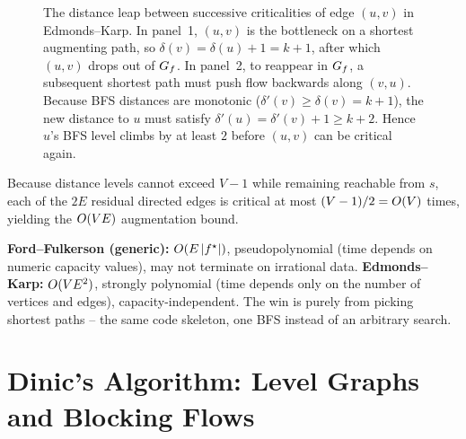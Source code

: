 \begin{figure}[H]
\caption{The distance leap between successive criticalities of edge $(u,v)$ in Edmonds--Karp. In panel~1, $(u,v)$ is the bottleneck on a shortest augmenting path, so $\delta(v)=\delta(u)+1=k+1$, after which $(u,v)$ drops out of $G_f$. In panel~2, to reappear in $G_f$, a subsequent shortest path must push flow backwards along $(v,u)$. Because BFS distances are monotonic ($\delta'(v)\ge\delta(v)=k+1$), the new distance to $u$ must satisfy $\delta'(u)=\delta'(v)+1\ge k+2$. Hence $u$'s BFS level climbs by at least $2$ before $(u,v)$ can be critical again.}
\label{ch12:fig-ek-critical}
\end{figure}

Because distance levels cannot exceed $V-1$ while remaining reachable from $s$, each of the $2E$ residual directed edges is critical at most $(V-1)/2 = O(V)$ times, yielding the $O(VE)$ augmentation bound.

\begin{complexitybox}
\textbf{Ford--Fulkerson (generic):} $O(E\,\lvert f^\star\rvert)$, pseudopolynomial (time depends on numeric capacity values), may
not terminate on irrational data. \quad
\textbf{Edmonds--Karp:} $O(VE^2)$, strongly polynomial (time depends only on the number of vertices and edges), capacity-independent.
The win is purely from picking shortest paths -- the same code skeleton, one BFS
instead of an arbitrary search.
\end{complexitybox}

\section{Dinic's Algorithm: Level Graphs and Blocking Flows}
\label{ch12:dinic}

